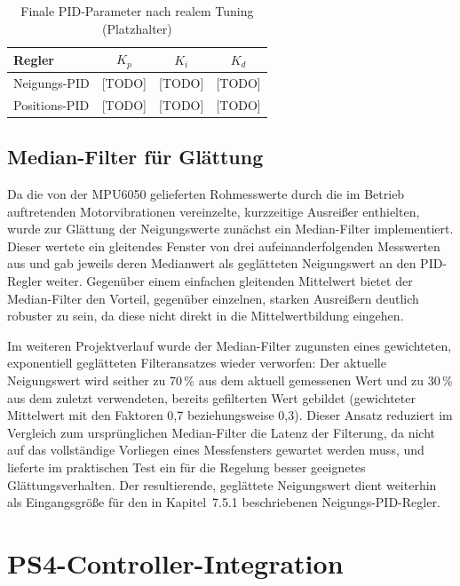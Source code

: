 \documentclass[12pt,ngerman,numbers=noenddot,abstracton,headsepline]{scrreprt}
\begin{document}
\begin{table}[h]
    \centering
    \caption{Finale PID-Parameter nach realem Tuning (Platzhalter)}
    \label{tab:pid_final}
    \begin{tabular}{|l|c|c|c|}
        \hline
        \textbf{Regler} & \textbf{$K_p$} & \textbf{$K_i$} & \textbf{$K_d$} \\
        \hline
        Neigungs-PID & [TODO] & [TODO] & [TODO] \\
        \hline
        Positions-PID & [TODO] & [TODO] & [TODO] \\
        \hline
    \end{tabular}
\end{table}

\subsection{Median-Filter für Glättung}
\label{subsec:median_filter}

Da die von der MPU6050 gelieferten Rohmesswerte durch die im Betrieb auftretenden Motorvibrationen vereinzelte, kurzzeitige Ausreißer enthielten, wurde zur Glättung der Neigungswerte zunächst ein Median-Filter implementiert. Dieser wertete ein gleitendes Fenster von drei aufeinanderfolgenden Messwerten aus und gab jeweils deren Medianwert als geglätteten Neigungswert an den PID-Regler weiter. Gegenüber einem einfachen gleitenden Mittelwert bietet der Median-Filter den Vorteil, gegenüber einzelnen, starken Ausreißern deutlich robuster zu sein, da diese nicht direkt in die Mittelwertbildung eingehen.

Im weiteren Projektverlauf wurde der Median-Filter zugunsten eines gewichteten, exponentiell geglätteten Filteransatzes wieder verworfen: Der aktuelle Neigungswert wird seither zu 70\,\% aus dem aktuell gemessenen Wert und zu 30\,\% aus dem zuletzt verwendeten, bereits gefilterten Wert gebildet (gewichteter Mittelwert mit den Faktoren 0,7 beziehungsweise 0,3). Dieser Ansatz reduziert im Vergleich zum ursprünglichen Median-Filter die Latenz der Filterung, da nicht auf das vollständige Vorliegen eines Messfensters gewartet werden muss, und lieferte im praktischen Test ein für die Regelung besser geeignetes Glättungsverhalten. Der resultierende, geglättete Neigungswert dient weiterhin als Eingangsgröße für den in Kapitel~7.5.1 beschriebenen Neigungs-PID-Regler.

\section{PS4-Controller-Integration}
\label{sec:ps4_integration}
\end{document}
